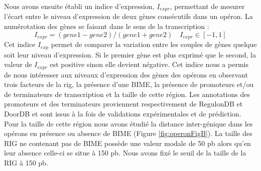 \documentclass[12pt,a4paper]{report}
\begin{document}
\begin{onehalfspace}
\begin{figure}[ht]
\label{fig:operon}
\end{figure}

Nous avons ensuite établi un indice d'expression, $I_{expr}$, permettant de mesurer l'écart entre le niveau d'expression de deux gènes consécutifs dans un opéron. La numérotation des gènes se faisant dans le sens de la transcription :
\[ I_{expr} = (gene1 - gene2) / (gene1 + gene2) \quad I_{expr} \in [-1,1]\]
Cet indice $I_{exp}$ permet de comparer la variation entre les couples de gènes quelque soit leur niveau d'expression. Si le premier gène est plus exprimé que le second, la valeur de $I_{expr}$ est positive sinon elle devient négative. Cet indice nous a permis de nous intéresser aux niveaux d'expression des gènes des opérons en observant trois facteurs de la \gls{rig}, la présence d'une BIME, la présence de promoteurs et/ou de terminateurs de transcription et la taille de cette région. Les annotations des promoteurs et des terminateurs proviennent respectivement de RegulonDB et DoorDB et sont issus à la fois de validations expérimentales et de prédiction. Pour la taille de cette région nous avons étudié la distance inter-génique dans les opérons en présence ou absence de BIME (Figure \autoref{fig:operonFigB}). La taille des RIG ne contenant pas de BIME possède une valeur modale de 50 pb alors qu'en leur absence celle-ci se situe à 150 pb. Nous avons fixé le seuil de la taille de la RIG à 150 pb.


\end{onehalfspace}
\end{document}
